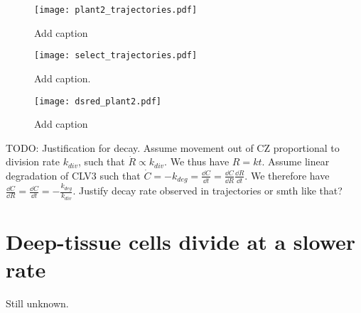 \begin{figure}[H]
  \centering
  \texttt{[image: plant2\_trajectories.pdf]}
  \caption{Add caption}
  \label{fig:corr_nNucl_nDivs}
\end{figure}

\begin{figure}[H]
  \centering
  \texttt{[image: select\_trajectories.pdf]}
  \caption{Add caption. }
  \label{fig:select_trajs}
\end{figure}

\begin{figure}[H]
  \centering
  \texttt{[image: dsred\_plant2.pdf]}
  \caption{Add caption}
  \label{fig:dsred_decay}
\end{figure}

TODO: Justification for decay. Assume movement out of CZ proportional to
division rate $k_{div}$, such that $\dot{R} \propto k_{div}$. We thus have
$R = kt$. Assume linear degradation of CLV3 such that $\dot{C} = -k_{deg} =
\frac{\dd C}{\dd t} = \frac{\dd C}{\dd R} \frac{\dd R}{\dd t}$. We therefore have
$\frac{\dd C}{\dd R} = \frac{\dd C}{\dd t} = -\frac{k_{deg}}{k_{div}}$. Justify
decay rate observed in trajectories or smth like that?


\section{Deep-tissue cells divide at a slower rate}
Still unknown.
